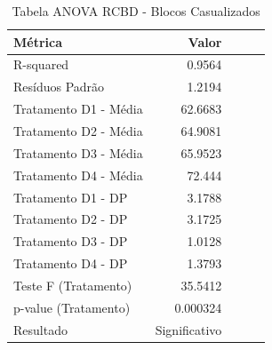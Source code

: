 \begin{table}[H]
\centering
\caption{Tabela ANOVA RCBD - Blocos Casualizados}
\label{tab:anova_rcbd}
\begin{tabular}{lrrrr}
\toprule
Métrica & Valor \\
\midrule
R-squared & 0.9564 \\
Resíduos Padrão & 1.2194 \\
Tratamento D1 - Média & 62.6683 \\
Tratamento D2 - Média & 64.9081 \\
Tratamento D3 - Média & 65.9523 \\
Tratamento D4 - Média & 72.444 \\
Tratamento D1 - DP & 3.1788 \\
Tratamento D2 - DP & 3.1725 \\
Tratamento D3 - DP & 1.0128 \\
Tratamento D4 - DP & 1.3793 \\
Teste F (Tratamento) & 35.5412 \\
p-value (Tratamento) & 0.000324 \\
Resultado & Significativo \\
\bottomrule
\end{tabular}
\end{table}
